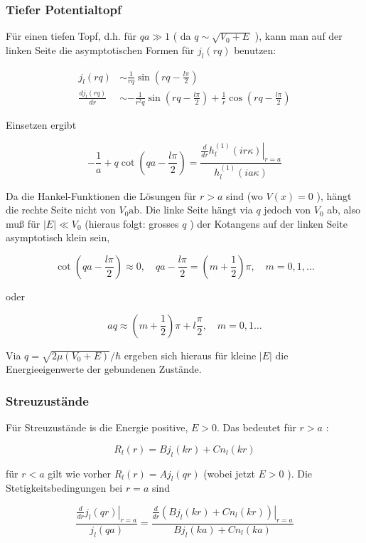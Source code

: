 \documentclass[10pt, letterpaper]{article}
\begin{document}
\subsubsection*{Tiefer Potentialtopf}
Für einen tiefen Topf, d.h. für $q a \gg 1$ ( da $q \sim \sqrt{V_{0}+E}$ ), kann man auf der linken Seite die asymptotischen Formen für $j_{l}(r q)$ benutzen:

$$
\begin{aligned}
j_{l}(r q) & \sim \frac{1}{r q} \sin \left(r q-\frac{l \pi}{2}\right) \\
\frac{d j_{l}(r q)}{d r} & \sim-\frac{1}{r^{2} q} \sin \left(r q-\frac{l \pi}{2}\right)+\frac{1}{r} \cos \left(r q-\frac{l \pi}{2}\right)
\end{aligned}
$$

Einsetzen ergibt

$$
-\frac{1}{a}+q \cot \left(q a-\frac{l \pi}{2}\right)=\frac{\left.\frac{d}{d r} h_{l}^{(1)}(i r \kappa)\right|_{r=a}}{h_{l}^{(1)}(i a \kappa)}
$$

Da die Hankel-Funktionen die Lösungen für $r>a$ sind (wo $V(x)=0$ ), hängt die rechte Seite nicht von $V_{0} \mathrm{ab}$. Die linke Seite hängt via $q$ jedoch von $V_{0}$ ab, also muß für $|E| \ll V_{0}$ (hieraus folgt: grosses $q$ ) der Kotangens auf der linken Seite asymptotisch klein sein,

$$
\cot \left(q a-\frac{l \pi}{2}\right) \approx 0, \quad q a-\frac{l \pi}{2}=\left(m+\frac{1}{2}\right) \pi, \quad m=0,1, \ldots
$$

oder

$$
a q \approx\left(m+\frac{1}{2}\right) \pi+l \frac{\pi}{2}, \quad m=0,1 \ldots
$$

Via $q=\sqrt{2 \mu\left(V_{0}+E\right)} / \hbar$ ergeben sich hieraus für kleine $|E|$ die Energieeigenwerte der gebundenen Zustände.








\subsubsection*{Streuzustände}
Für Streuzustände is die Energie positive, $E>0$. Das bedeutet für $r>a$ :

$$
R_{l}(r)=B j_{l}(k r)+C n_{l}(k r)
$$

für $r<a$ gilt wie vorher $R_{l}(r)=A j_{l}(q r)$ (wobei jetzt $E>0$ ). Die Stetigkeitsbedingungen bei $r=a$ sind

$$
\frac{\left.\frac{d}{d r} j_{l}(q r)\right|_{r=a}}{j_{l}(q a)}=\frac{\left.\frac{d}{d r}\left(B j_{l}(k r)+C n_{l}(k r)\right)\right|_{r=a}}{B j_{l}(k a)+C n_{l}(k a)}
$$
\end{document}
